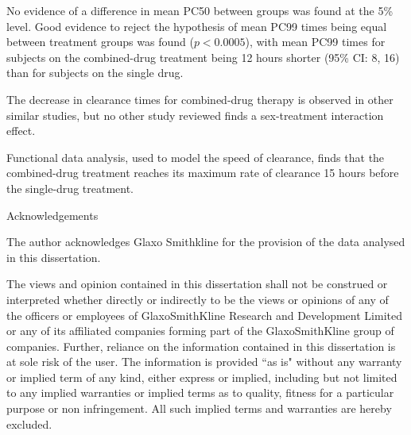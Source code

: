 \documentclass[a4paper,12pt,openright,twoside]{book}
\begin{document}
No evidence of a difference in mean PC50 between groups was found at the 5\% level. Good evidence to reject the hypothesis of mean PC99 times being equal between treatment groups was found ($p<0.0005$), with mean PC99 times for subjects on the combined-drug treatment being 12 hours shorter (95\% CI: 8, 16) than for subjects on the single drug.

The decrease in clearance times for combined-drug therapy is observed in other similar studies, but no other study reviewed finds a sex-treatment interaction effect.

Functional data analysis, used to model the speed of clearance, finds that the combined-drug treatment reaches its maximum rate of clearance 15 hours before the single-drug treatment.
\pagebreak
\begin{center}
{\large Acknowledgements}\\[1cm]
\end{center}
The author acknowledges Glaxo Smithkline for the provision of the data analysed in this dissertation.

\pagebreak
\vspace*{\fill}
{\large The views and opinion contained in this dissertation shall not be construed or interpreted whether directly or indirectly to be the views or opinions of any of the officers or employees of GlaxoSmithKline Research and Development Limited or any of its affiliated companies forming part of the GlaxoSmithKline group of companies. Further, reliance on the information contained in this dissertation is at sole risk of the user. The information is provided ``as is" without any warranty or implied term of any kind, either express or implied, including but not limited to any implied warranties or implied terms as to quality, fitness for a particular purpose or non infringement. All such implied terms and warranties are hereby excluded.}
\vspace*{\fill}
\tableofcontents

\mainmatter
\setlength{\parindent}{0.0in}
\setlength{\parskip}{0.1in}







\addappheadtotoc
\appendix
\appendixpage


\backmatter

\renewcommand{\bibname}{References}
{\singlespace}
\end{document}
